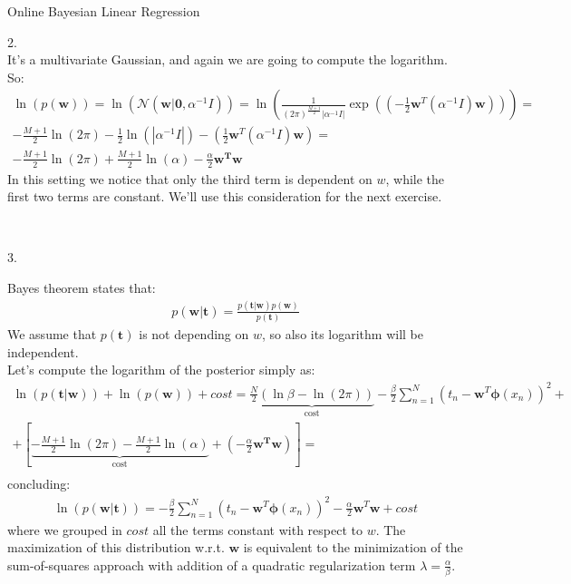 \documentclass[english]{exercisesheet}
\begin{document}
\begin{nexercise}{Online Bayesian Linear Regression}
  \par 
  \begin{solution} 2.
  \\ It's a multivariate Gaussian, and again we are going to compute the logarithm. So:
  \begin{align*}
  \ln(p(\bm{w})) = \ln(\mathcal{N}(\bm {w} | \bm {0}, \alpha^{-1}I)) =  \ln\left(\frac{1}{(2\pi)^{\frac{M+1}{2}}|\alpha^{-1}I|}\exp\left((-\frac{1}{2}\bm{w}^{T}(\alpha^{-1}I)\bm{w})\right) \right)= \\ -\frac{M+1}{2}\ln(2\pi)-\frac{1}{2}\ln(|\alpha^{-1}I|)-\left(\frac{1}{2}\bm{w}^{T}(\alpha^{-1}I)\bm{w}\right) = \\ -\frac{M+1}{2}\ln(2\pi)+\frac{M+1}{2}\ln(\alpha)-\frac{\alpha}{2}\bm{w^{T}w}
  \end{align*}
  In this setting we notice that only the third term is dependent on $w$, while the first two terms are constant. We'll use this consideration for the next exercise.
    \end{solution}\\
    \begin{solution} 3.
  \par 
  Bayes theorem states that:
  \begin{align*}
  p(\bm{w}|\bm{t}) = \frac{p(\bm{t}|\bm{w})p(\bm{w})}{p(\bm{t})}
  \end{align*}
  We assume that $p(\bm t)$ is not depending on $w$, so also its logarithm will be independent. \\ Let's compute the logarithm of the posterior simply as:
  \begin{align*}
      \ln(p(\bm{t}|\bm{w}))+ \ln(p(\bm{w})) + cost = \underbrace{\frac{N}{2}\left(\ln\beta-\ln(2\pi)\right)}_\text{cost} - \frac{\beta}{2}\sum_{n=1}^{N}(t_{n}-\bm{w}^{T}\bm{\phi}(x_{n}))^{2} + \\ + \left[\underbrace{-\frac{M+1}{2}\ln(2\pi)-\frac{M+1}{2}\ln(\alpha)}_\text{cost}+\left(-\frac{\alpha}{2}\bm{w^{T}w}\right)\right] = \\
      \end{align*}
      concluding:
     \begin{align*}
      \ln(p(\bm{w}|\bm{t})) = -\frac{\beta}{2}\sum_{n=1}^{N}(t_{n}-\bm{w}^{T}\bm{\phi}(x_{n}))^{2}-\frac{\alpha}{2}\bm{w}^{T}\bm{w} + cost
    \end{align*}
    where we grouped in $cost$ all the terms constant with respect to $w$.
    The maximization of this distribution w.r.t. $\bm{w}$ is equivalent to the minimization of the sum-of-squares approach with addition of a quadratic regularization term $\lambda = \frac{\alpha}{\beta}$. \\

\end{solution}
\end{nexercise}
\end{document}
